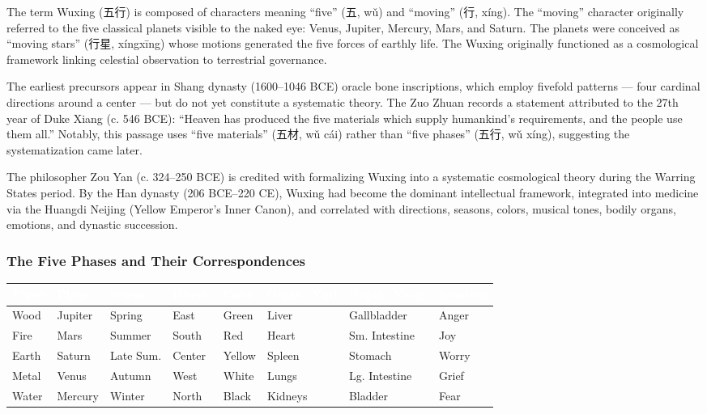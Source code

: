 \documentclass[11pt,letterpaper]{article}
\newcommand{\tableheader}[1]{\textbf{\sffamily\textcolor{white}{#1}}}
\begin{document}
The term Wuxing (五行) is composed of characters meaning ``five'' (五, wǔ) and ``moving'' (行, xíng). The ``moving'' character originally referred to the five classical planets visible to the naked eye: Venus, Jupiter, Mercury, Mars, and Saturn. The planets were conceived as ``moving stars'' (行星, xíngxīng) whose motions generated the five forces of earthly life. The Wuxing originally functioned as a cosmological framework linking celestial observation to terrestrial governance.

The earliest precursors appear in Shang dynasty (1600--1046 BCE) oracle bone inscriptions, which employ fivefold patterns --- four cardinal directions around a center --- but do not yet constitute a systematic theory. The Zuo Zhuan records a statement attributed to the 27th year of Duke Xiang (c. 546 BCE): ``Heaven has produced the five materials which supply humankind's requirements, and the people use them all.'' Notably, this passage uses ``five materials'' (五材, wǔ cái) rather than ``five phases'' (五行, wǔ xíng), suggesting the systematization came later.

The philosopher Zou Yan (c. 324--250 BCE) is credited with formalizing Wuxing into a systematic cosmological theory during the Warring States period. By the Han dynasty (206 BCE--220 CE), Wuxing had become the dominant intellectual framework, integrated into medicine via the Huangdi Neijing (Yellow Emperor's Inner Canon), and correlated with directions, seasons, colors, musical tones, bodily organs, emotions, and dynastic succession.

\subsubsection{The Five Phases and Their Correspondences}

\begin{center}
\begin{tabularx}{\textwidth}{L{1.5cm}L{1.5cm}L{1.5cm}L{1.3cm}L{1.3cm}L{1.5cm}L{1.5cm}L{1.5cm}}
\toprule
{}
\tableheader{Phase} & \tableheader{Planet} & \tableheader{Season} & \tableheader{Direct.} & \tableheader{Color} & \tableheader{Organ (Yin)} & \tableheader{Organ (Yang)} & \tableheader{Emotion} \\
\midrule
Wood & Jupiter & Spring & East & Green & Liver & Gallbladder & Anger \\
Fire & Mars & Summer & South & Red & Heart & Sm. Intestine & Joy \\
Earth & Saturn & Late Sum. & Center & Yellow & Spleen & Stomach & Worry \\
Metal & Venus & Autumn & West & White & Lungs & Lg. Intestine & Grief \\
Water & Mercury & Winter & North & Black & Kidneys & Bladder & Fear \\
\bottomrule
\end{tabularx}
\end{center}
\end{document}
